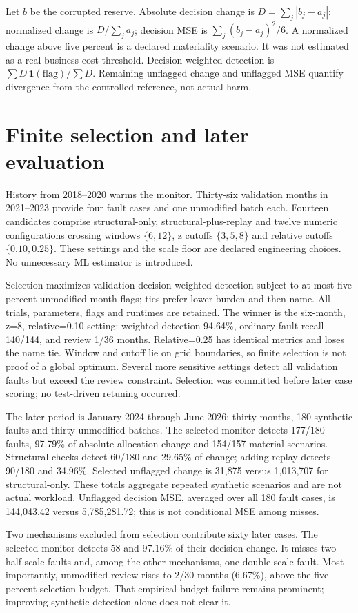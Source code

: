 \documentclass[11pt]{article}
\begin{document}
Let $b$ be the corrupted reserve. Absolute decision change is $D=\sum_j|b_j-a_j|$; normalized change is $D/\sum_j a_j$; decision MSE is $\sum_j(b_j-a_j)^2/6$. A normalized change above five percent is a declared materiality scenario. It was not estimated as a real business-cost threshold. Decision-weighted detection is $\sum D\,\mathbf{1}(\mathrm{flag})/\sum D$. Remaining unflagged change and unflagged MSE quantify divergence from the controlled reference, not actual harm.
\section{Finite selection and later evaluation}
History from 2018--2020 warms the monitor. Thirty-six validation months in 2021--2023 provide four fault cases and one unmodified batch each. Fourteen candidates comprise structural-only, structural-plus-replay and twelve numeric configurations crossing windows $\{6,12\}$, z cutoffs $\{3,5,8\}$ and relative cutoffs $\{0.10,0.25\}$. These settings and the scale floor are declared engineering choices. No unnecessary ML estimator is introduced.

Selection maximizes validation decision-weighted detection subject to at most five percent unmodified-month flags; ties prefer lower burden and then name. All trials, parameters, flags and runtimes are retained. The winner is the six-month, z=8, relative=0.10 setting: weighted detection 94.64\%, ordinary fault recall 140/144, and review 1/36 months. Relative=0.25 has identical metrics and loses the name tie. Window and cutoff lie on grid boundaries, so finite selection is not proof of a global optimum. Several more sensitive settings detect all validation faults but exceed the review constraint. Selection was committed before later case scoring; no test-driven retuning occurred.

The later period is January 2024 through June 2026: thirty months, 180 synthetic faults and thirty unmodified batches. The selected monitor detects 177/180 faults, 97.79\% of absolute allocation change and 154/157 material scenarios. Structural checks detect 60/180 and 29.65\% of change; adding replay detects 90/180 and 34.96\%. Selected unflagged change is 31,875 versus 1,013,707 for structural-only. These totals aggregate repeated synthetic scenarios and are not actual workload. Unflagged decision MSE, averaged over all 180 fault cases, is 144,043.42 versus 5,785,281.72; this is not conditional MSE among misses.

Two mechanisms excluded from selection contribute sixty later cases. The selected monitor detects 58 and 97.16\% of their decision change. It misses two half-scale faults and, among the other mechanisms, one double-scale fault. Most importantly, unmodified review rises to 2/30 months (6.67\%), above the five-percent selection budget. That empirical budget failure remains prominent; improving synthetic detection alone does not clear it.
\end{document}
